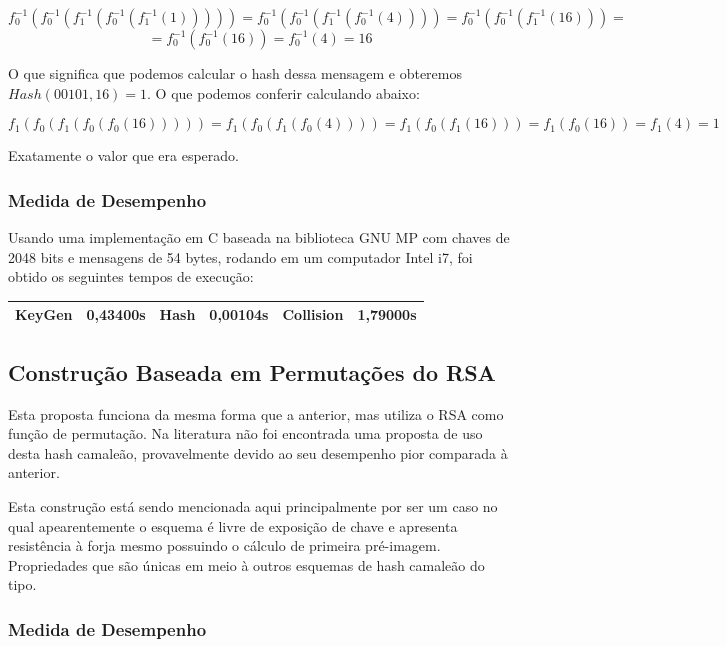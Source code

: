 \documentclass[a4paper]{article}
\begin{document}
$$
f_0^{-1}(f_0^{-1}(f_1^{-1}(f_0^{-1}(f_1^{-1}(1))))) =
f_0^{-1}(f_0^{-1}(f_1^{-1}(f_0^{-1}(4)))) =
f_0^{-1}(f_0^{-1}(f_1^{-1}(16))) =
$$
$$
=f_0^{-1}(f_0^{-1}(16)) = f_0^{-1}(4) = 16
$$

O que significa que podemos calcular o hash dessa mensagem e obteremos
$Hash(00101, 16)=1$. O que podemos conferir calculando abaixo:

$$
f_1(f_0(f_1(f_0(f_0(16))))) = f_1(f_0(f_1(f_0(4)))) = f_1(f_0(f_1(16))) =
f_1(f_0(16)) = f_1(4) = 1
$$

Exatamente o valor que era esperado.

\subsubsection{Medida de Desempenho}

Usando uma implementação em C baseada na biblioteca GNU MP com chaves
de 2048 bits e mensagens de 54 bytes, rodando em um computador Intel
i7, foi obtido os seguintes tempos de execução:

\begin{center}
\begin{tabular}{|c|c|c|c|c|c|}
  \hline
  KeyGen & 0,43400s & Hash & 0,00104s & Collision & 1,79000s\\
  \hline
\end{tabular}
\end{center}


\subsection{Construção Baseada em Permutações do RSA}

Esta proposta funciona da mesma forma que a anterior, mas utiliza o
RSA como função de permutação. Na literatura não foi encontrada uma
proposta de uso desta hash camaleão, provavelmente devido ao seu
desempenho pior comparada à anterior. 

Esta construção está sendo mencionada aqui principalmente por ser um
caso no qual apearentemente o esquema é livre de exposição de chave e
apresenta resistência à forja mesmo possuindo o cálculo de primeira
pré-imagem. Propriedades que são únicas em meio à outros esquemas de
hash camaleão do tipo.

\subsubsection{Medida de Desempenho}
\end{document}
